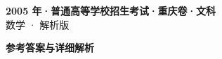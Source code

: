 \documentclass[zihao=-4, a4paper]{ctexart}
\begin{document}
\begin{center}
  {\Large\bfseries 2005 年·普通高等学校招生考试·重庆卷·文科}\\[4pt]
  {\large 数学 · 解析版}
\end{center}
\medskip
{}

\clearpage
{}
\begin{center}{\Large\bfseries 参考答案与详细解析}\end{center}
\medskip

\end{document}
